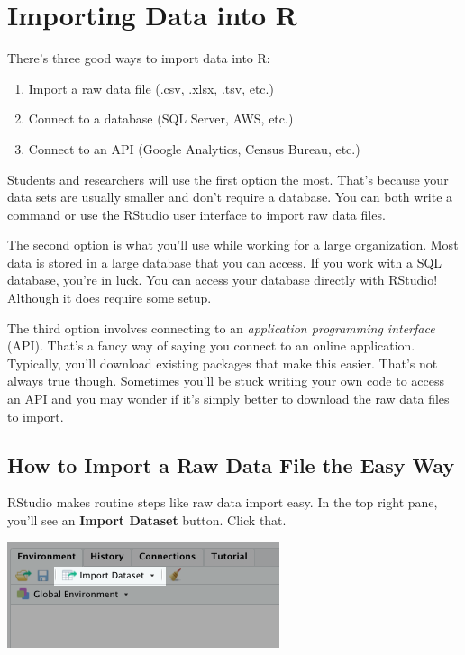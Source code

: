 \documentclass[
]{book}
\providecommand{\tightlist}{%
  \setlength{\itemsep}{0pt}\setlength{\parskip}{0pt}}
\begin{document}
\begin{center}
\hypertarget{importdata}{%
\chapter{Importing Data into R}\label{importdata}}

There's three good ways to import data into R:

\begin{enumerate}
\def\labelenumi{\arabic{enumi}.}
\tightlist
\item
  Import a raw data file (.csv, .xlsx, .tsv, etc.)
\item
  Connect to a database (SQL Server, AWS, etc.)
\item
  Connect to an API (Google Analytics, Census Bureau, etc.)
\end{enumerate}

Students and researchers will use the first option the most. That's because your data sets are usually smaller and don't require a database. You can both write a command or use the RStudio user interface to import raw data files.

The second option is what you'll use while working for a large organization. Most data is stored in a large database that you can access. If you work with a SQL database, you're in luck. You can access your database directly with RStudio! Although it does require some setup.

The third option involves connecting to an \emph{application programming interface} (API). That's a fancy way of saying you connect to an online application. Typically, you'll download existing packages that make this easier. That's not always true though. Sometimes you'll be stuck writing your own code to access an API and you may wonder if it's simply better to download the raw data files to import.

\hypertarget{how-to-import-a-raw-data-file-the-easy-way}{%
\section{How to Import a Raw Data File the Easy Way}\label{how-to-import-a-raw-data-file-the-easy-way}}

RStudio makes routine steps like raw data import easy. In the top right pane, you'll see an \textbf{Import Dataset} button. Click that.

\begin{center}\includegraphics[width=0.5\linewidth]{1.58_Import_Raw_Data} \end{center}


\end{center}
\end{document}

